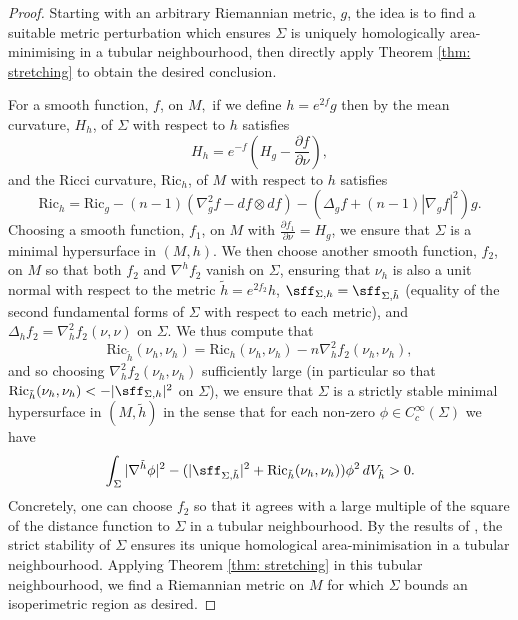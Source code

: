 \documentclass[12pt]{article}
\begin{document}
\begin{proof}
    Starting with an arbitrary Riemannian metric, $g$, the idea is to find a suitable metric perturbation which ensures $\Sigma$ is uniquely homologically area-minimising in a tubular neighbourhood, then directly apply Theorem \ref{thm: stretching} to obtain the desired conclusion.
    
    \bigskip

    For a smooth function, $f$, on $M,$ if we define $h = e^{2f}g$ then by \cite[1.159/(1.163)]{B87} the mean curvature, $H_{h}$, of $\Sigma$ with respect to $h$ satisfies
    $$H_{h} = e^{-f}\left(H_g - \frac{\partial f}{\partial \nu}\right),$$
    and the Ricci curvature, $\mathrm{Ric}_{h}$, of $M$ with respect to $h$ satisfies
    $$\mathrm{Ric}_{h} = \mathrm{Ric}_g - (n-1)(\nabla^2_gf - df \otimes df) - (\Delta_g f + (n-1)|\nabla_gf|^2)g.$$ 
    Choosing a smooth function, $f_1$, on $M$ with $\frac{\partial f_1}{\partial \nu} = H_g$, we ensure that $\Sigma$ is a minimal hypersurface in $(M,h)$. We then choose another smooth function, $f_2$, on $M$ so that both $f_2$ and $\nabla^{h}f_2$ vanish on $\Sigma$, ensuring that $\nu_{h}$ is also a unit normal with respect to the metric $\tilde{h} = e^{2f_2}h$, $\sff_{\Sigma,h} = \sff_{\Sigma,\tilde{h}}$ (equality of the second fundamental forms of $\Sigma$ with respect to each metric), and $\Delta_{h}f_2 = \nabla^2_{h}f_2(\nu,\nu)$ on $\Sigma$. We thus compute that
    $$\mathrm{Ric}_{\tilde{h}}(\nu_h,\nu_h) = \mathrm{Ric}_h(\nu_h,\nu_h) - n\nabla^2_hf_2(\nu_h,\nu_h),$$
    and so choosing $\nabla^2_hf_2(\nu_h,\nu_h)$ sufficiently large (in particular so that $\mathrm{Ric}_{\tilde{h}}(\nu_h,\nu_h) < - |\sff_{\Sigma,h}|^2$ on $\Sigma$), we ensure that $\Sigma$ is a strictly stable minimal hypersurface in $(M,\tilde{h})$ in the sense that for each non-zero $\phi \in C^{\infty}_c(\Sigma)$ we have
    $$\int_{\Sigma} |\nabla^{\tilde{h}} \phi|^2 - (|\sff_{\Sigma,\tilde{h}}|^2 +\mathrm{Ric}_{\tilde{h}}(\nu_h,\nu_h))\phi^2 \, dV_{\tilde{h}} > 0.$$
    Concretely, one can choose $f_2$ so that it agrees with a large multiple of the square of the distance function to $\Sigma$ in a tubular neighbourhood.
    By the results of \cite{W94}, the strict stability of $\Sigma$ ensures its unique homological area-minimisation in a tubular neighbourhood. Applying Theorem \ref{thm: stretching} in this tubular neighbourhood, we find a Riemannian metric on $M$ for which $\Sigma$ bounds an isoperimetric region as desired.
\end{proof}
\end{document}
